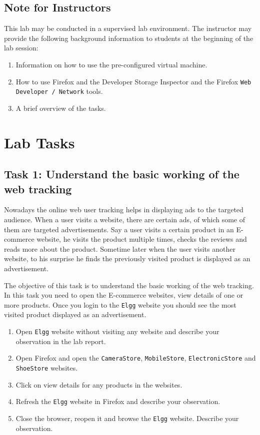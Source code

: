 \subsection{Note for Instructors} 

This lab may be conducted in a
supervised lab environment. The instructor may provide the following
background information to students at the beginning of the lab session:
\begin{enumerate}
  \item Information on how to use the pre-configured virtual machine.
  \item How to use Firefox and the Developer Storage Inspector and
the Firefox {\tt Web Developer / Network} tools.
  \item A brief overview of the tasks.
       
\end{enumerate}


\section{Lab Tasks}


\subsection{Task 1: Understand the basic working of the web tracking}

Nowadays the online web user tracking helps in displaying ads to the targeted audience. 
When a user visits a website, there are certain ads, of which some of them are targeted advertisements. 
Say a user visits a certain product in an E-commerce website, he visits the product multiple times, checks the reviews and reads more about the product.
Sometime later when the user visits another website, to his surprise he finds the previously visited product is displayed as an advertisement.

The objective of this task is to understand the basic working of the web tracking. 
In this task you need to open the E-commerce websites, view details of one or more products. 
Once you login to the {\tt Elgg} website you should see the most visited product displayed as an advertisement. 


\begin{enumerate}
  \item Open {\tt Elgg} website without visiting any website and describe your observation in the lab report.
  \item Open Firefox and open the {\tt CameraStore}, {\tt MobileStore}, {\tt ElectronicStore} and {\tt ShoeStore} websites.
  \item Click on view details for any products in the websites.
  \item Refresh the {\tt Elgg} website in Firefox and describe your observation.
  \item Close the browser, reopen it and browse the {\tt Elgg} website. Describe your observation.       
\end{enumerate}


